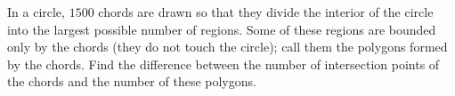 In a circle, $1500$ chords are drawn so that they divide the interior of the circle into the largest possible number of regions. Some of these regions are bounded only by the chords (they do not touch the circle); call them the polygons formed by the chords. Find the difference between the number of intersection points of the chords and the number of these polygons.
